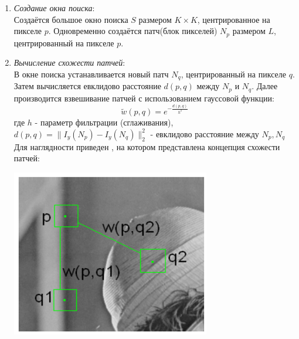 \begin{enumerate}[]
	\item \textit{Создание окна поиска}:\\
	Создаётся большое окно поиска $S$ размером $K \times K$, центрированное на пикселе $p$. Одновременно создаётся патч(блок пикселей) $N_p$ размером $L$, центрированный на пикселе $p$.
	\item \textit{Вычисление схожести патчей}:\\
	В окне поиска устанавливается новый патч $N_q$, центрированный на пикселе $q$. Затем вычисляется евклидово расстояние $d(p,q)$ между $N_p$ и $N_q$. Далее производится взвешивание патчей с использованием гауссовой функции:
	\begin{equation}
		\tilde w(p,q) = e^{-\frac{d(p,q)}{h^2}}
	\end{equation}
	где $h$ - параметр фильтрации (сглаживания),\\
	$d(p,q) = \|I_y(N_p) - I_y(N_q)\|^2_2$ - евклидово расстояние между $N_p, N_q$\\
	Для наглядности приведен , на котором представлена концепция схожести патчей:\\
	\begin{minipage}{\textwidth}
		\centering
		\vspace{\mfloatsep} %
		\includegraphics[keepaspectratio=true,scale=0.47] {my_folder/images/denoising/nlm_weights.png}
		\label{fig:nlm-weights}
		\vspace{\mfloatsep} %

\end{minipage}
\end{enumerate}
